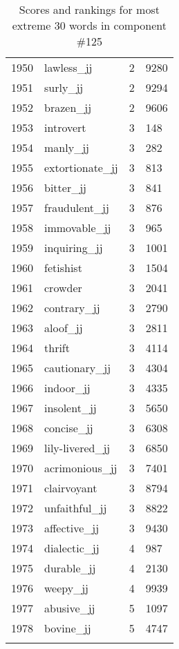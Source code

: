 \begin{longtable}[!htbp]{| rlr@{.}l |}
    1950 & lawless\_jj & 2 & 9280 \\
    1951 & surly\_jj & 2 & 9294 \\
    1952 & brazen\_jj & 2 & 9606 \\
    1953 & introvert & 3 & 148 \\
    1954 & manly\_jj & 3 & 282 \\
    1955 & extortionate\_jj & 3 & 813 \\
    1956 & bitter\_jj & 3 & 841 \\
    1957 & fraudulent\_jj & 3 & 876 \\
    1958 & immovable\_jj & 3 & 965 \\
    1959 & inquiring\_jj & 3 & 1001 \\
    1960 & fetishist & 3 & 1504 \\
    1961 & crowder & 3 & 2041 \\
    1962 & contrary\_jj & 3 & 2790 \\
    1963 & aloof\_jj & 3 & 2811 \\
    1964 & thrift & 3 & 4114 \\
    1965 & cautionary\_jj & 3 & 4304 \\
    1966 & indoor\_jj & 3 & 4335 \\
    1967 & insolent\_jj & 3 & 5650 \\
    1968 & concise\_jj & 3 & 6308 \\
    1969 & lily-livered\_jj & 3 & 6850 \\
    1970 & acrimonious\_jj & 3 & 7401 \\
    1971 & clairvoyant & 3 & 8794 \\
    1972 & unfaithful\_jj & 3 & 8822 \\
    1973 & affective\_jj & 3 & 9430 \\
    1974 & dialectic\_jj & 4 & 987 \\
    1975 & durable\_jj & 4 & 2130 \\
    1976 & weepy\_jj & 4 & 9939 \\
    1977 & abusive\_jj & 5 & 1097 \\
    1978 & bovine\_jj & 5 & 4747 \\
    \hline
    \caption{Scores and rankings for most extreme 30 words in component \#125} \\
\end{longtable}
